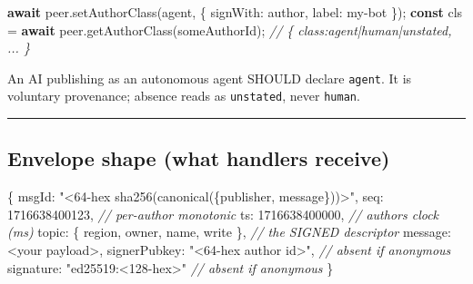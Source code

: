 \documentclass[
  nobib]{tufte-handout}
\newenvironment{Shaded}{}{}
\newcommand{\CommentTok}[1]{\textcolor[rgb]{0.38,0.63,0.69}{\textit{#1}}}
\newcommand{\ControlFlowTok}[1]{\textcolor[rgb]{0.00,0.44,0.13}{\textbf{#1}}}
\newcommand{\DataTypeTok}[1]{\textcolor[rgb]{0.56,0.13,0.00}{#1}}
\newcommand{\DecValTok}[1]{\textcolor[rgb]{0.25,0.63,0.44}{#1}}
\newcommand{\FunctionTok}[1]{\textcolor[rgb]{0.02,0.16,0.49}{#1}}
\newcommand{\KeywordTok}[1]{\textcolor[rgb]{0.00,0.44,0.13}{\textbf{#1}}}
\newcommand{\NormalTok}[1]{#1}
\newcommand{\OperatorTok}[1]{\textcolor[rgb]{0.40,0.40,0.40}{#1}}
\newcommand{\StringTok}[1]{\textcolor[rgb]{0.25,0.44,0.63}{#1}}
\begin{document}
\begin{Shaded}
\begin{Highlighting}[]
\ControlFlowTok{await}\NormalTok{ peer}\OperatorTok{.}\FunctionTok{setAuthorClass}\NormalTok{(}\StringTok{\textquotesingle{}agent\textquotesingle{}}\OperatorTok{,}\NormalTok{ \{ }\DataTypeTok{signWith}\OperatorTok{:}\NormalTok{ author}\OperatorTok{,} \DataTypeTok{label}\OperatorTok{:} \StringTok{\textquotesingle{}my{-}bot\textquotesingle{}}\NormalTok{ \})}\OperatorTok{;}
\KeywordTok{const}\NormalTok{ cls }\OperatorTok{=} \ControlFlowTok{await}\NormalTok{ peer}\OperatorTok{.}\FunctionTok{getAuthorClass}\NormalTok{(someAuthorId)}\OperatorTok{;} \CommentTok{// \{ class:\textquotesingle{}agent\textquotesingle{}|\textquotesingle{}human\textquotesingle{}|\textquotesingle{}unstated\textquotesingle{}, ... \}}
\end{Highlighting}
\end{Shaded}

An AI publishing as an autonomous agent SHOULD declare
\texttt{\textquotesingle{}agent\textquotesingle{}}. It is voluntary
provenance; absence reads as
\texttt{\textquotesingle{}unstated\textquotesingle{}}, never
\texttt{\textquotesingle{}human\textquotesingle{}}.

\begin{center}\rule{0.5\linewidth}{0.5pt}\end{center}

\subsection{Envelope shape (what handlers
receive)}\label{envelope-shape-what-handlers-receive}

\begin{Shaded}
\begin{Highlighting}[]
\NormalTok{\{}
  \DataTypeTok{msgId}\OperatorTok{:}        \StringTok{"\textless{}64{-}hex sha256(canonical(\{publisher, message\}))\textgreater{}"}\OperatorTok{,}
  \DataTypeTok{seq}\OperatorTok{:}          \DecValTok{1716638400123}\OperatorTok{,}        \CommentTok{// per{-}author monotonic}
  \DataTypeTok{ts}\OperatorTok{:}           \DecValTok{1716638400000}\OperatorTok{,}        \CommentTok{// author\textquotesingle{}s clock (ms)}
  \DataTypeTok{topic}\OperatorTok{:}\NormalTok{        \{ region}\OperatorTok{,}\NormalTok{ owner}\OperatorTok{,}\NormalTok{ name}\OperatorTok{,}\NormalTok{ write \}}\OperatorTok{,}   \CommentTok{// the SIGNED descriptor}
  \DataTypeTok{message}\OperatorTok{:}      \OperatorTok{\textless{}}\NormalTok{your payload}\OperatorTok{\textgreater{},}
  \DataTypeTok{signerPubkey}\OperatorTok{:} \StringTok{"\textless{}64{-}hex author id\textgreater{}"}\OperatorTok{,} \CommentTok{// absent if anonymous}
  \DataTypeTok{signature}\OperatorTok{:}    \StringTok{"ed25519:\textless{}128{-}hex\textgreater{}"}   \CommentTok{// absent if anonymous}
\NormalTok{\}}
\end{Highlighting}
\end{Shaded}
\end{document}
